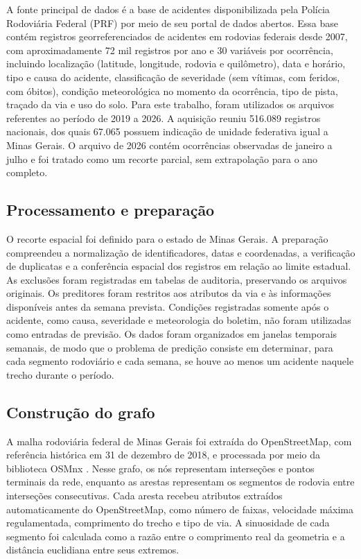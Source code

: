 \documentclass[12pt]{article}
\begin{document}
A fonte principal de dados é a base de acidentes disponibilizada pela
Polícia Rodoviária Federal (PRF) por meio de seu portal de dados
abertos. Essa base contém registros georreferenciados de acidentes em
rodovias federais desde 2007, com aproximadamente 72 mil registros por
ano e 30 variáveis por ocorrência, incluindo localização (latitude,
longitude, rodovia e quilômetro), data e horário, tipo e causa do
acidente, classificação de severidade (sem vítimas, com feridos, com
óbitos), condição meteorológica no momento da ocorrência, tipo de
pista, traçado da via e uso do solo. Para este trabalho, foram
utilizados os arquivos referentes ao período de 2019 a 2026. A aquisição
reuniu 516.089 registros nacionais, dos quais 67.065 possuem indicação
de unidade federativa igual a Minas Gerais. O arquivo de 2026 contém
ocorrências observadas de janeiro a julho e foi tratado como um recorte
parcial, sem extrapolação para o ano completo.

\subsection{Processamento e preparação}

O recorte espacial foi definido para o estado de Minas Gerais. A
preparação compreendeu a normalização de identificadores, datas e
coordenadas, a verificação de duplicatas e a conferência espacial dos
registros em relação ao limite estadual. As exclusões foram registradas
em tabelas de auditoria, preservando os arquivos originais. Os
preditores foram restritos aos atributos da via e às informações
disponíveis antes da semana prevista. Condições registradas somente
após o acidente, como causa, severidade e meteorologia do boletim, não
foram utilizadas como entradas de previsão. Os dados foram organizados em janelas temporais
semanais, de modo que o problema de predição consiste em determinar,
para cada segmento rodoviário e cada semana, se houve ao menos um
acidente naquele trecho durante o período.

\subsection{Construção do grafo}

A malha rodoviária federal de Minas Gerais foi extraída do
OpenStreetMap, com referência histórica em 31 de dezembro de 2018,
e processada por meio da biblioteca
OSMnx \cite{boeing2017}. Nesse grafo, os nós representam interseções
e pontos terminais da rede, enquanto as arestas representam os
segmentos de rodovia entre interseções consecutivas. Cada aresta
recebeu atributos extraídos automaticamente do OpenStreetMap, como
número de faixas, velocidade máxima regulamentada, comprimento do
trecho e tipo de via. A sinuosidade de cada segmento foi calculada
como a razão entre o comprimento real da geometria e a distância
euclidiana entre seus extremos.
\end{document}
